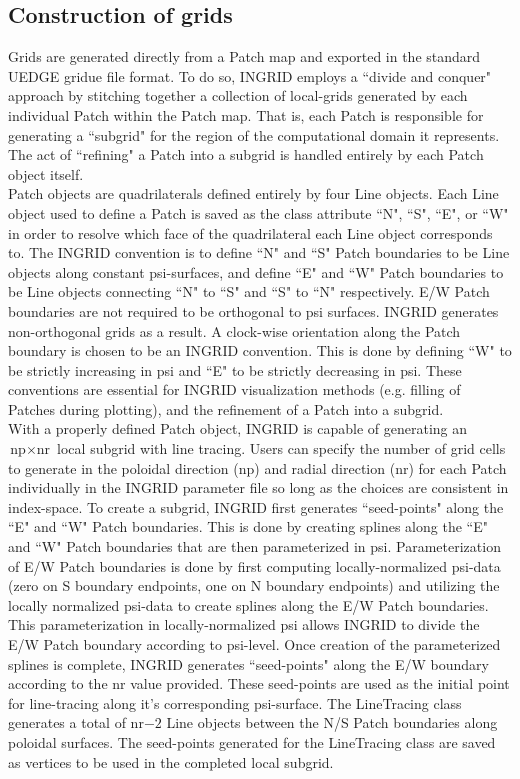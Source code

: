 \subsection{Construction of grids}
Grids are generated directly from a Patch map and exported in the standard UEDGE gridue file format. To do so, INGRID employs a ``divide and conquer" approach by stitching together a collection of local-grids generated by each individual Patch within the Patch map. That is, each Patch is responsible for generating a ``subgrid" for the region of the computational domain it represents. The act of ``refining" a Patch into a subgrid is handled entirely by each Patch object itself.\\
Patch objects are quadrilaterals defined entirely by four Line objects. Each Line object used to define a Patch is saved as the class attribute ``N", ``S", ``E", or ``W" in order to resolve which face of the quadrilateral each Line object corresponds to. The INGRID convention is to define ``N" and ``S" Patch boundaries to be Line objects along constant psi-surfaces, and define ``E" and ``W" Patch boundaries to be Line objects connecting ``N" to ``S" and ``S" to ``N" respectively. E/W Patch boundaries are not required to be orthogonal to psi surfaces. INGRID generates non-orthogonal grids as a result. A clock-wise orientation along the Patch boundary is chosen to be an INGRID convention. This is done by defining ``W" to be strictly increasing in psi and ``E" to be strictly decreasing in psi. These conventions are essential for INGRID visualization methods (e.g. filling of Patches during plotting), and the refinement of a Patch into a subgrid.  \\
With a properly defined Patch object, INGRID is capable of generating an $\text{np} \times \text{nr}$ local subgrid with line tracing. Users can specify the number of grid cells to generate in the poloidal direction (np) and radial direction (nr) for each Patch individually in the INGRID parameter file so long as the choices are consistent in index-space. To create a subgrid, INGRID first generates ``seed-points" along the ``E" and ``W" Patch boundaries. This is done by creating splines along the ``E" and ``W" Patch boundaries that are then parameterized in psi. Parameterization of E/W Patch boundaries is done by first computing locally-normalized psi-data (zero on S boundary endpoints, one on N boundary endpoints) and utilizing the locally normalized psi-data to create splines along the E/W Patch boundaries. This parameterization in locally-normalized psi allows INGRID to divide the E/W Patch boundary according to psi-level. Once creation of the parameterized splines is complete, INGRID generates ``seed-points" along the E/W boundary according to the nr value provided. These seed-points are used as the initial point for line-tracing along it's corresponding psi-surface. The LineTracing class generates a total of nr$-2$ Line objects between the N/S Patch boundaries along poloidal surfaces. The seed-points generated for the LineTracing class are saved as vertices to be used in the completed local subgrid.\\
